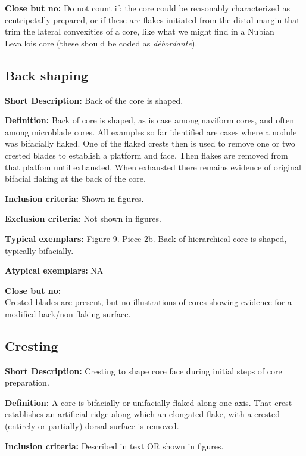 \documentclass[
]{article}
\begin{document}
\textbf{Close but no:} Do not count if: the core could be reasonably
characterized as centripetally prepared, or if these are flakes
initiated from the distal margin that trim the lateral convexities of a
core, like what we might find in a Nubian Levallois core (these should
be coded as \emph{débordante}).

\hypertarget{back-shaping}{%
\subsection{Back shaping}\label{back-shaping}}

\textbf{Short Description:} Back of the core is shaped.

\textbf{Definition:} Back of core is shaped, as is case among naviform
cores, and often among microblade cores. All examples so far identified
are cases where a nodule was bifacially flaked. One of the flaked crests
then is used to remove one or two crested blades to establish a platform
and face. Then flakes are removed from that platfom until exhausted.
When exhausted there remains evidence of original bifacial flaking at
the back of the core.

\textbf{Inclusion criteria:} Shown in figures.

\textbf{Exclusion criteria:} Not shown in figures.

\textbf{Typical exemplars:} Figure 9. Piece 2b. Back of hierarchical
core is shaped, typically bifacially.

\textbf{Atypical exemplars:} NA

\textbf{Close but no:}\\
Crested blades are present, but no illustrations of cores showing
evidence for a modified back/non-flaking surface.

\hypertarget{cresting}{%
\subsection{Cresting}\label{cresting}}

\textbf{Short Description:} Cresting to shape core face during initial
steps of core preparation.

\textbf{Definition:} A core is bifacially or unifacially flaked along
one axis. That crest establishes an artificial ridge along which an
elongated flake, with a crested (entirely or partially) dorsal surface
is removed.

\textbf{Inclusion criteria:} Described in text OR shown in figures.
\end{document}
